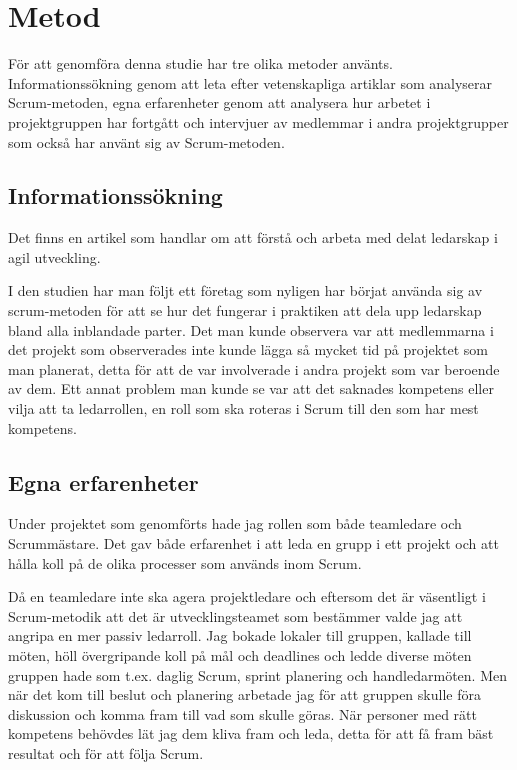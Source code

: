 \section{Metod}
För att genomföra denna studie har tre olika metoder använts. Informationssökning genom att leta efter vetenskapliga artiklar som analyserar Scrum-metoden, egna erfarenheter genom att analysera hur arbetet i projektgruppen har fortgått och intervjuer av medlemmar i andra projektgrupper som också har använt sig av Scrum-metoden.

\subsection{Informationssökning}
Det finns en artikel som handlar om att förstå och arbeta med delat ledarskap i agil utveckling. \cite{sharedleader}

I den studien har man följt ett företag som nyligen har börjat använda sig av scrum-metoden för att se hur det fungerar i praktiken att dela upp ledarskap bland alla inblandade parter. Det man kunde observera var att medlemmarna i det projekt som observerades inte kunde lägga så mycket tid på projektet som man planerat, detta för att de var involverade i andra projekt som var beroende av dem. Ett annat problem man kunde se var att det saknades kompetens eller vilja att ta ledarrollen, en roll som ska roteras i Scrum till den som har mest kompetens. 

\subsection{Egna erfarenheter}
Under projektet som genomförts hade jag rollen som både teamledare och Scrummästare. Det gav både erfarenhet i att leda en grupp i ett projekt och att hålla koll på de olika processer som används inom Scrum.

Då en teamledare inte ska agera projektledare och eftersom det är väsentligt i Scrum-metodik att det är utvecklingsteamet som bestämmer valde jag att angripa en mer passiv ledarroll. Jag bokade lokaler till gruppen, kallade till möten, höll övergripande koll på mål och deadlines och ledde diverse möten gruppen hade som t.ex. daglig Scrum, sprint planering och handledarmöten. Men när det kom till beslut och planering arbetade jag för att gruppen skulle föra diskussion och komma fram till vad som skulle göras. När personer med rätt kompetens behövdes lät jag dem kliva fram och leda, detta för att få fram bäst resultat och för att följa Scrum.

